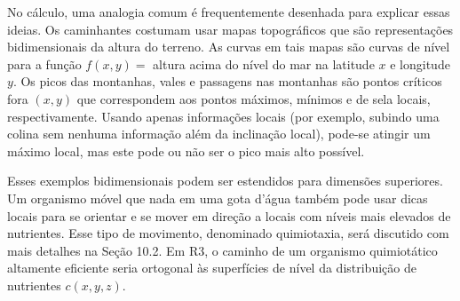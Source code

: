No cálculo, uma analogia comum é frequentemente desenhada para explicar essas ideias. Os caminhantes costumam usar mapas topográficos que são representações bidimensionais da altura do terreno. As curvas em tais mapas são curvas de nível para a função $f(x, y) =$ altura acima do nível do mar na latitude $x$ e longitude $y$. Os picos das montanhas, vales e passagens nas montanhas são pontos críticos fora $(x, y)$ que correspondem aos pontos máximos, mínimos e de sela locais, respectivamente. Usando apenas informações locais (por exemplo, subindo uma colina sem nenhuma informação além da inclinação local), pode-se atingir um máximo local, mas este pode ou não ser o pico mais alto possível.

Esses exemplos bidimensionais podem ser estendidos para dimensões superiores. Um organismo móvel que nada em uma gota d'água também pode usar dicas locais para se orientar e se mover em direção a locais com níveis mais elevados de nutrientes. Esse tipo de movimento, denominado quimiotaxia, será discutido com mais detalhes na Seção 10.2. Em R3, o caminho de um organismo quimiotático altamente eficiente seria ortogonal às superfícies de nível da distribuição de nutrientes $c(x, y, z)$.


